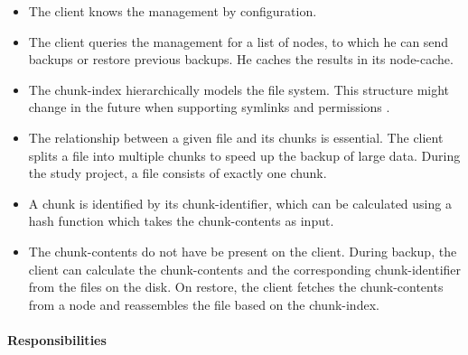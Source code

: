 \begin{itemize}
    \item The \gls{client} knows the \gls{management} by configuration.
    \item The \gls{client} queries the \gls{management} for a list of \glspl{node}, to which he can send backups or restore previous backups. He caches the results in its \gls{node-cache}.
    \item The \gls{chunk-index} hierarchically models the file system. This structure might change in the future when supporting symlinks and permissions \cite{borg-data-structures}.
    \item The relationship between a given \gls{file} and its \glspl{chunk} is essential. The \gls{client} splits a \gls{file} into multiple \glspl{chunk} to speed up the backup of large data. During the study project, a \gls{file} consists of exactly one \gls{chunk}.
    \item A \gls{chunk} is identified by its \gls{chunk-identifier}, which can be calculated using a hash function which takes the \glspl{chunk-content}  as input.
    \item The \glspl{chunk-content} do not have be present on the \gls{client}. During backup, the \gls{client} can calculate the \glspl{chunk-content} and the corresponding \gls{chunk-identifier} from the \glspl{file} on the disk. On restore, the \gls{client} fetches the \glspl{chunk-content} from a \gls{node} and reassembles the \gls{file} based on the \gls{chunk-index}.
\end{itemize}


\paragraph{Responsibilities}


